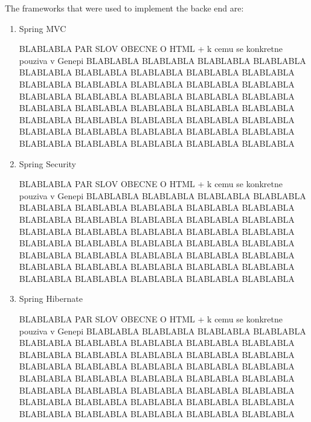 \documentclass[thesis=B,english]{FITthesis}[2012/10/20]
\begin{document}
The frameworks that were used to implement the backe end are: 
\begin{enumerate}

\item{Spring MVC}

BLABLABLA PAR SLOV OBECNE O HTML + k cemu se konkretne pouziva v Genepi
BLABLABLA BLABLABLA BLABLABLA BLABLABLA BLABLABLA BLABLABLA BLABLABLA BLABLABLA BLABLABLA BLABLABLA BLABLABLA BLABLABLA BLABLABLA BLABLABLA BLABLABLA BLABLABLA BLABLABLA BLABLABLA BLABLABLA BLABLABLA BLABLABLA BLABLABLA BLABLABLA BLABLABLA BLABLABLA BLABLABLA BLABLABLA BLABLABLA BLABLABLA BLABLABLA BLABLABLA BLABLABLA BLABLABLA BLABLABLA BLABLABLA BLABLABLA BLABLABLA BLABLABLA BLABLABLA 
\item{Spring Security}

BLABLABLA PAR SLOV OBECNE O HTML + k cemu se konkretne pouziva v Genepi
BLABLABLA BLABLABLA BLABLABLA BLABLABLA BLABLABLA BLABLABLA BLABLABLA BLABLABLA BLABLABLA BLABLABLA BLABLABLA BLABLABLA BLABLABLA BLABLABLA BLABLABLA BLABLABLA BLABLABLA BLABLABLA BLABLABLA BLABLABLA BLABLABLA BLABLABLA BLABLABLA BLABLABLA BLABLABLA BLABLABLA BLABLABLA BLABLABLA BLABLABLA BLABLABLA BLABLABLA BLABLABLA BLABLABLA BLABLABLA BLABLABLA BLABLABLA BLABLABLA BLABLABLA BLABLABLA 
\item{Spring Hibernate}

BLABLABLA PAR SLOV OBECNE O HTML + k cemu se konkretne pouziva v Genepi
BLABLABLA BLABLABLA BLABLABLA BLABLABLA BLABLABLA BLABLABLA BLABLABLA BLABLABLA BLABLABLA BLABLABLA BLABLABLA BLABLABLA BLABLABLA BLABLABLA BLABLABLA BLABLABLA BLABLABLA BLABLABLA BLABLABLA BLABLABLA BLABLABLA BLABLABLA BLABLABLA BLABLABLA BLABLABLA BLABLABLA BLABLABLA BLABLABLA BLABLABLA BLABLABLA BLABLABLA BLABLABLA BLABLABLA BLABLABLA BLABLABLA BLABLABLA BLABLABLA BLABLABLA BLABLABLA 

\end{enumerate}
\end{document}
